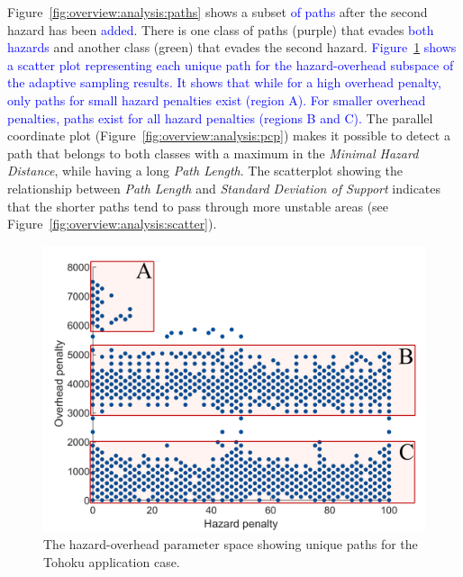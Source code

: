 \documentclass{egpubl}
\newcommand{\diff}[1]{\textcolor{blue}{#1}}
\begin{document}
Figure~\ref{fig:overview:analysis:paths} shows a subset \diff{of paths} after the second hazard has been \diff{added}. There is one class of paths (purple) that evades \diff{both hazards} and another class (green) that evades the second hazard. \diff{Figure~\ref{fig:sampling:tohoku} shows a scatter plot representing each unique path for the hazard-overhead subspace of the adaptive sampling results. It shows that while for a high overhead penalty, only paths for small hazard penalties exist (region A). For smaller overhead penalties, paths exist for all hazard penalties (regions B and C).} The parallel coordinate plot (Figure~\ref{fig:overview:analysis:pcp}) makes it possible to detect a path that belongs to both classes with a maximum in the \emph{Minimal Hazard Distance}, while having a long \emph{Path Length}. The scatterplot showing the relationship between \emph{Path Length} and \emph{Standard Deviation of Support} indicates that the shorter paths tend to pass through more unstable areas (see Figure~\ref{fig:overview:analysis:scatter}).

\begin{figure}
	\newcommand{\abImageComparisonWidth}{0.7\linewidth}
	\centering
		\includegraphics[width=\abImageComparisonWidth]{figures/adaptive_sampling_tohoku.png}
	\caption{The hazard-overhead parameter space showing unique paths for the Tohoku application case.}
	\label{fig:sampling:tohoku}
\end{figure}

\end{document}
